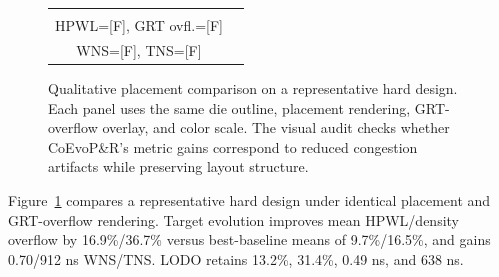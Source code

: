 \begin{figure}[!ht]
\begin{tabular}{@{}cc@{}}
\begin{minipage}[t]{0.49\columnwidth}
\textbf{(d) CoEvoP\&R}\\
HPWL=[F], GRT ovfl.=[F]\\
WNS=[F], TNS=[F]
\end{minipage}
\end{tabular}
\caption{Qualitative placement comparison on a representative hard design.
Each panel uses the same die outline, placement rendering, GRT-overflow
overlay, and color scale. The visual audit checks whether CoEvoP\&R's metric
gains correspond to reduced congestion artifacts while preserving layout structure.}
\label{fig:placement-qualitative}
\end{figure}

Figure~\ref{fig:placement-qualitative} compares a representative hard design
under identical placement and GRT-overflow rendering. Target evolution improves
mean HPWL/density overflow by
16.9\%/36.7\% versus best-baseline means of 9.7\%/16.5\%, and gains
0.70/912 ns WNS/TNS. LODO retains 13.2\%, 31.4\%, 0.49 ns, and 638 ns.

